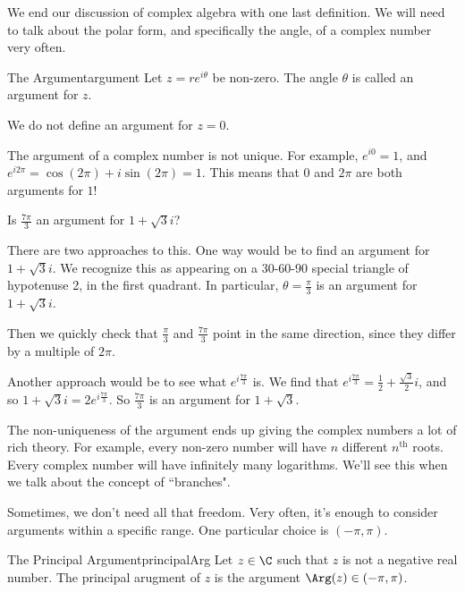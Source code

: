 We end our discussion of complex algebra with one last definition. We will need to talk about the polar form, and specifically the angle, of a complex number very often.

\begin{defbo}{The Argument}{argument} Let $z = re^{i\theta}$ be non-zero. The angle $\theta$ is called an argument for $z$.

We do not define an argument for $z = 0$.
\end{defbo}

The argument of a complex number is not unique. For example, $e^{i0} = 1$, and $e^{i2\pi} = \cos(2\pi) + i\sin(2\pi) = 1$. This means that $0$ and $2\pi$ are both arguments for $1$!

\begin{ex}{}{} Is $\frac{7\pi}{3}$ an argument for $1 + \sqrt{3}i$?

There are two approaches to this. One way would be to find an argument for $1 + \sqrt{3}i$. We recognize this as appearing on a 30-60-90 special triangle of hypotenuse 2, in the first quadrant. In particular, $\theta = \frac{\pi}{3}$ is an argument for $1 + \sqrt{3}i$.

Then we quickly check that $\frac{\pi}{3}$ and $\frac{7\pi}{3}$ point in the same direction, since they differ by a multiple of $2\pi$.

\vspace{10pt}

Another approach would be to see what $e^{i\frac{7\pi}{3}}$ is. We find that $e^{i\frac{7\pi}{3}} = \frac{1}{2} + \frac{\sqrt{3}}{2}i$, and so $1 + \sqrt{3}i = 2e^{i\frac{7\pi}{3}}$. So $\frac{7\pi}{3}$ is an argument for $1 + \sqrt{3}$.

\end{ex}

The non-uniqueness of the argument ends up giving the complex numbers a lot of rich theory. For example, every non-zero number will have $n$ different $n^{\text{th}}$ roots. Every complex number will have infinitely many logarithms. We'll see this when we talk about the concept of ``branches".

Sometimes, we don't need all that freedom. Very often, it's enough to consider arguments within a specific range. One particular choice is $(-\pi,\pi)$.

\begin{defbo}{The Principal Argument}{principalArg} 
Let $z\in \C$ such that $z$ is not a negative real number. The principal arugment of $z$ is the argument $\Arg(z) \in (-\pi,\pi)$.
\end{defbo}

